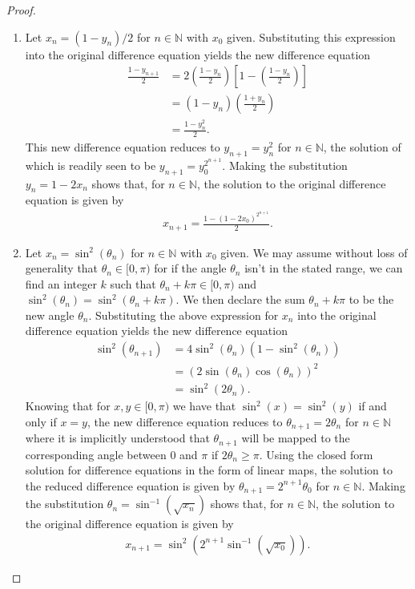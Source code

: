 \begin{proof}
  \begin{enumerate}
    \item Let $x_n = (1 - y_n) / 2$ for $n \in \mathbb{N}$ with $x_0$ given.
      Substituting this expression into the original difference equation yields the new
      difference equation
      \begin{align*}
        \frac{1 - y_{n+1}}{2} &= 2\left( \frac{1 - y_n}{2} \right) \left[ 1 - \left(\frac{1 - y_n}{2}\right) \right] \\
        &= (1 - y_n)\left(\frac{1 + y_n}{2}\right) \\
        &= \frac{1 - y_n^2}{2}.
      \end{align*}
      This new difference equation reduces to $y_{n+1} = y_n^2$ for $n\in\mathbb{N}$,
      the solution of which is readily seen to be $y_{n+1} = y_0 ^{2^{n+1}}$. Making
      the substitution $y_n = 1 - 2 x_n$ shows that, for $n\in\mathbb{N}$,
      the solution to the original difference equation is given by
      \begin{align*}
        x_{n+1} = \frac{1 - (1- 2x_0)^{2^{n+1}}}{2}.
      \end{align*}
    \item Let $x_n = \sin^2(\theta_n)$ for $n \in \mathbb{N}$ with $x_0$ given.
      We may assume without loss of generality that $\theta_n \in [0, \pi)$ for
      if the angle $\theta_n$ isn't in the stated range, we can find an integer $k$ such that
      $\theta_n + k \pi \in [0, \pi)$ and $\sin^2(\theta_n) = \sin^2(\theta_n + k\pi)$. We then declare the sum $\theta_n + k \pi$ to be the new angle $\theta_n$.
      Substituting the above expression for $x_n$ into the original difference equation yields the new
      difference equation
      \begin{align*}
        \sin^2(\theta_{n+1}) &= 4 \sin^2(\theta_{n}) \left( 1 - \sin^2(\theta_{n})\right)\\
        &= \left(2 \sin(\theta_n) \cos(\theta_n)\right)^2 \\
        &= \sin^2(2\theta_n).
      \end{align*}
      Knowing that for $x, y \in [0, \pi)$ we have that $\sin^2(x) = \sin^2(y)$ if and only if $x = y$,
      the new difference equation reduces to $\theta_{n+1} = 2\theta_n$ for $n\in\mathbb{N}$ where it is implicitly
      understood that $\theta_{n+1}$ will be mapped to the corresponding angle between 0 and $\pi$ if
      $2\theta_n \geq \pi$.
      Using the closed form solution for difference equations in the form of linear maps,
      the solution to the reduced difference equation is given by $\theta_{n+1} = 2^{n+1}\theta_0$
      for $n\in\mathbb{N}$. Making the substitution $\theta_n =  \sin^{-1}(\sqrt{x_n})$ shows that, for $n\in\mathbb{N}$,
      the solution to the original difference equation is given by
      \begin{align*}
        x_{n+1} = \sin^2(2^{n+1}\sin^{-1}(\sqrt{x_0})).
      \end{align*}

  \end{enumerate}
\end{proof}
\newpage
